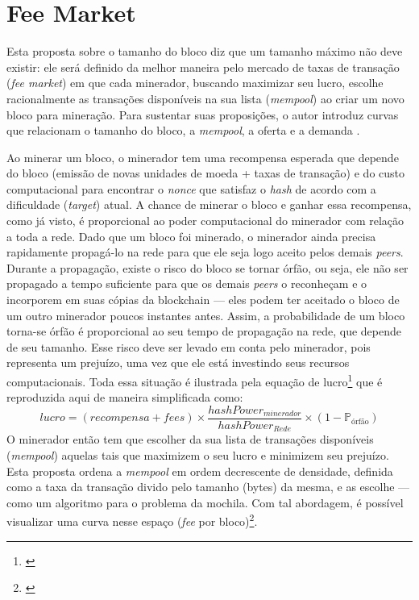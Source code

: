 \section{Fee Market}

Esta proposta sobre o tamanho do bloco diz que um tamanho máximo não deve existir: ele será definido da melhor maneira pelo mercado de taxas de transação (\textit{fee market}) em que cada minerador, buscando maximizar seu lucro, escolhe racionalmente as transações disponíveis na sua lista (\textit{mempool}) ao criar um novo bloco para mineração. Para sustentar suas proposições, o autor introduz curvas que relacionam o tamanho do bloco, a \textit{mempool}, a oferta e a demanda \cite{bib:fee-market}.

Ao minerar um bloco, o minerador tem uma recompensa esperada que depende do bloco (emissão de novas unidades de moeda + taxas de transação) e do custo computacional para encontrar o \textit{nonce} que satisfaz o \textit{hash} de acordo com a dificuldade (\textit{target}) atual. A chance de minerar o bloco e ganhar essa recompensa, como já visto, é proporcional ao poder computacional do minerador com relação a toda a rede. Dado que um bloco foi minerado, o minerador ainda precisa rapidamente propagá-lo na rede para que ele seja logo aceito pelos demais \textit{peers}. Durante a propagação, existe o risco do bloco se tornar órfão, ou seja, ele não ser propagado a tempo suficiente para que os demais \textit{peers} o reconheçam e o incorporem em suas cópias da blockchain --- eles podem ter aceitado o bloco de um outro minerador poucos instantes antes. Assim, a probabilidade de um bloco torna-se órfão é proporcional ao seu tempo de propagação na rede, que depende de seu tamanho. Esse risco deve ser levado em conta pelo minerador, pois representa um prejuízo, uma vez que ele está investindo seus recursos computacionais. Toda essa situação é ilustrada pela equação de lucro\footnote{\cite[p. 4, Eq. 5]{bib:fee-market}} que é reproduzida aqui de maneira simplificada como:
$$
lucro = (recompensa + fees) \times \frac{hashPower_{minerador}}{hashPower_{Rede}} \times ( 1 - \mathbb{P}_\text{órfão} )
$$
O minerador então tem que escolher da sua lista de transações disponíveis (\textit{mempool}) aquelas tais que maximizem o seu lucro e minimizem seu prejuízo. Esta proposta ordena a \textit{mempool} em ordem decrescente de densidade, definida como a taxa da transação divido pelo tamanho (bytes) da mesma, e as escolhe --- como um algoritmo para o problema da mochila. Com tal abordagem, é possível visualizar uma curva nesse espaço (\textit{fee} por bloco)\footnote{\cite[p. 5, Fig. 3]{bib:fee-market}}.

